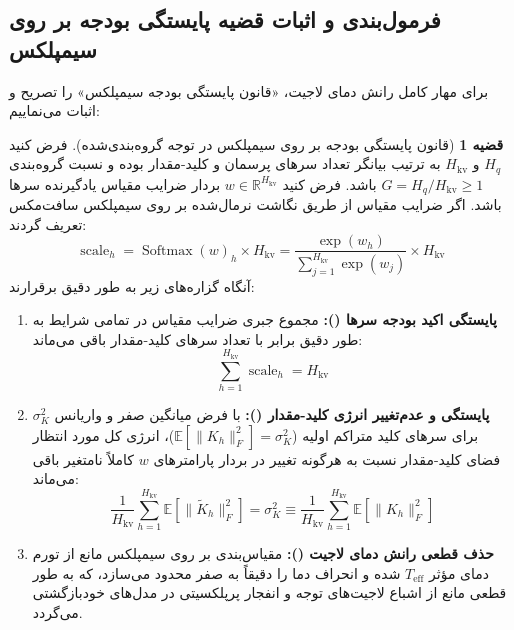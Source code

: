 \documentclass[12pt,a4paper]{report}
\theoremstyle{definition}
\newtheorem{theorem}{قضیه}[chapter]
\begin{document}
\subsection{فرمول‌بندی و اثبات قضیه پایستگی بودجه بر روی سیمپلکس}
برای مهار کامل رانش دمای لاجیت، «قانون پایستگی بودجه سیمپلکس» را تصریح و اثبات می‌نماییم:

\begin{theorem}[قانون پایستگی بودجه بر روی سیمپلکس در توجه گروه‌بندی‌شده]
\label{thm:simplex_conservation_persian}
فرض کنید $H_q$ و $H_{\text{kv}}$ به ترتیب بیانگر تعداد سرهای پرسمان و کلید-مقدار بوده و نسبت گروه‌بندی $G = H_q / H_{\text{kv}} \ge 1$ باشد. فرض کنید $w \in \mathbb{R}^{H_{\text{kv}}}$ بردار ضرایب مقیاس یادگیرنده سرها باشد. اگر ضرایب مقیاس از طریق نگاشت نرمال‌شده بر روی سیمپلکس سافت‌مکس تعریف گردند:
\begin{equation}
    \operatorname{scale}_h = \operatorname{Softmax}(w)_h \times H_{\text{kv}} = \frac{\exp(w_h)}{\sum_{j=1}^{H_{\text{kv}}} \exp(w_j)} \times H_{\text{kv}}
\end{equation}
آنگاه گزاره‌های زیر به طور دقیق برقرارند:
\begin{enumerate}
    \item \textbf{پایستگی اکید بودجه سرها ():} مجموع جبری ضرایب مقیاس در تمامی شرایط به طور دقیق برابر با تعداد سرهای کلید-مقدار باقی می‌ماند:
    \begin{equation}
        \sum_{h=1}^{H_{\text{kv}}} \operatorname{scale}_h = H_{\text{kv}}
    \end{equation}
    \item \textbf{پایستگی و عدم‌تغییر انرژی کلید-مقدار ():} با فرض میانگین صفر و واریانس $\sigma_K^2$ برای سرهای کلید متراکم اولیه ($\mathbb{E}[\|K_h\|_F^2] = \sigma_K^2$)، انرژی کل مورد انتظار فضای کلید-مقدار نسبت به هرگونه تغییر در بردار پارامترهای $w$ کاملاً نامتغیر باقی می‌ماند:
    \begin{equation}
        \frac{1}{H_{\text{kv}}} \sum_{h=1}^{H_{\text{kv}}} \mathbb{E}\left[\|\tilde{K}_h\|_F^2\right] = \sigma_K^2 \equiv \frac{1}{H_{\text{kv}}} \sum_{h=1}^{H_{\text{kv}}} \mathbb{E}\left[\|K_h\|_F^2\right]
    \end{equation}
    \item \textbf{حذف قطعی رانش دمای لاجیت ():} مقیاس‌بندی بر روی سیمپلکس مانع از تورم دمای مؤثر $T_{\text{eff}}$ شده و انحراف دما را دقیقاً به صفر محدود می‌سازد، که به طور قطعی مانع از اشباع لاجیت‌های توجه و انفجار پرپلکسیتی در مدل‌های خودبازگشتی می‌گردد.
\end{enumerate}
\end{theorem}
\end{document}

